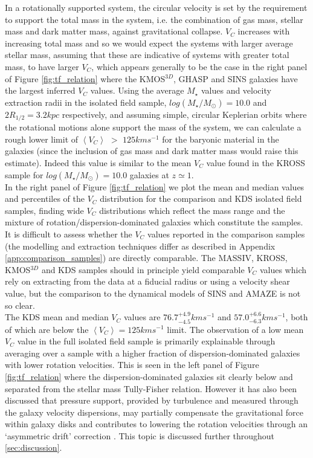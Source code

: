\documentclass[fleqn,usenatbib]{mn2e}
\begin{document}
In a rotationally supported system, the circular velocity is set by the requirement to support the total mass in the system, i.e. the combination of gas mass, stellar mass and dark matter mass, against gravitational collapse.
$V_{C}$ increases with increasing total mass and so we would expect the systems with larger average stellar mass, assuming that these are indicative of systems with greater total mass, to have larger $V_{C}$, which appears generally to be the case in the right panel of Figure \ref{fig:tf_relation} where the KMOS$^{3D}$, GHASP and SINS galaxies have the largest inferred $V_{C}$ values.
Using the average $M_{\star}$ values and velocity extraction radii in the isolated field sample, $log(M_{\star}/M_{\odot})=10.0$ and $2R_{1/2} = 3.2kpc$ respectively, and assuming simple, circular Keplerian orbits where the rotational motions alone support the mass of the system, we can calculate a rough lower limit of $\left<V_{C}\right>$ $>$ $125kms^{-1}$ for the baryonic material in the galaxies (since the inclusion of gas mass and dark matter mass would raise this estimate).
Indeed this value is similar to the mean $V_{C}$ value found in the KROSS sample for $log(M_{\star}/M_{\odot})=10.0$ galaxies at $z\simeq1$. \\

In the right panel of Figure \ref{fig:tf_relation} we plot the mean and median values and percentiles of the $V_{C}$ distribution for the comparison and KDS isolated field samples, finding wide $V_{C}$ distributions which reflect the mass range and the mixture of rotation/dispersion-dominated galaxies which constitute the samples.
It is difficult to assess whether the $V_{C}$ values reported in the comparison samples (the modelling and extraction techniques differ as described in Appendix \ref{app:comparison_samples}) are directly comparable.
The MASSIV, KROSS, KMOS$^{3D}$ and KDS samples should in principle yield comparable $V_{C}$ values which rely on extracting from the data at a fiducial radius or using a velocity shear value, but the comparison to the dynamical models of SINS and AMAZE is not so clear. \\

The KDS mean and median $V_{C}$ values are $76.7^{+4.9}_{-4.5}kms^{-1}$ and $57.0^{+6.6}_{-6.3}kms^{-1}$, both of which are below the $\left<V_{C}\right> = 125kms^{-1}$ limit.
The observation of a low mean $V_{C}$ value in the full isolated field sample is primarily explainable through averaging over a sample with a higher fraction of dispersion-dominated galaxies with lower rotation velocities.
This is seen in the left panel of Figure \ref{fig:tf_relation} where the dispersion-dominated galaxies sit clearly below and separated from the stellar mass Tully-Fisher relation.
However it has also been discussed that pressure support, provided by turbulence and measured through the galaxy velocity dispersions, may partially compensate the gravitational force within galaxy disks and contributes to lowering the rotation velocities through an `asymmetric drift' correction \citep[e.g.][]{Burkert2010,Newman2013,Genzel2017}.
This topic is discussed further throughout \cref{sec:discussion}. \\\\
\end{document}
